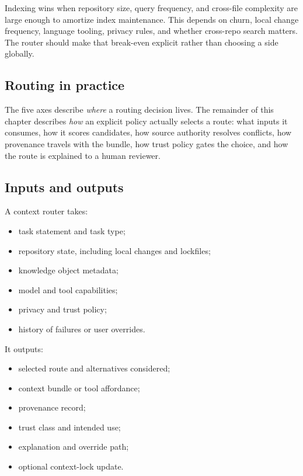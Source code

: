 \documentclass[
  11pt,
  letterpaper,
  numbers=noendperiod,
  parskip=half]{scrartcl}
\providecommand{\tightlist}{%
  \setlength{\itemsep}{0pt}\setlength{\parskip}{0pt}}
\begin{document}
Indexing wins when repository size, query frequency, and cross-file
complexity are large enough to amortize index maintenance. This depends
on churn, local change frequency, language tooling, privacy rules, and
whether cross-repo search matters. The router should make that
break-even explicit rather than choosing a side globally.
\fi

\subsection*{Routing in practice}\label{sec-router}

The five axes describe \emph{where} a routing decision lives. The
remainder of this chapter describes \emph{how} an explicit policy
actually selects a route: what inputs it consumes, how it scores
candidates, how source authority resolves conflicts, how provenance
travels with the bundle, how trust policy gates the choice, and how
the route is explained to a human reviewer.

\subsection{Inputs and outputs}\label{sec-router-io}

A context router takes:

\begin{itemize}
\tightlist
\item
  task statement and task type;
\item
  repository state, including local changes and lockfiles;
\item
  knowledge object metadata;
\item
  model and tool capabilities;
\item
  privacy and trust policy;
\item
  history of failures or user overrides.
\end{itemize}

It outputs:

\begin{itemize}
\tightlist
\item
  selected route and alternatives considered;
\item
  context bundle or tool affordance;
\item
  provenance record;
\item
  trust class and intended use;
\item
  explanation and override path;
\item
  optional context-lock update.
\end{itemize}
\end{document}
